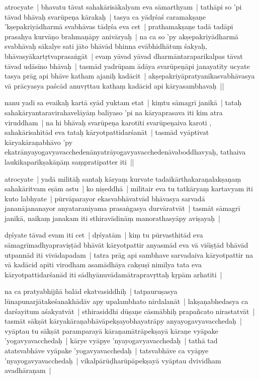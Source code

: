 \documentclass[article,a4paper]{memoir}
\begin{document}
	  \pstart atrocyate | bhavatu tā\-vat sahakā\-risā\-kalyam eva sā\-marthyam | tathā\-pi so 'pi tā\-vad bhā\-vaḥ svarū\-peṇa kā\-rakaḥ | \label{thakur75-74.28} tasya ca yā\-dṛśaś caramakṣaṇe 'kṣepakriyā\-dharmā\- svabhā\-vas tā\-dṛśa eva cet | \label{thakur75-74.29} prathamakṣaṇe tadā\- tadā\-pi prasahya kurvā\-ṇo brahmaṇā\-py anivā\-ryaḥ | na ca so 'py akṣepakriyā\-dharmā\- svabhā\-vaḥ sā\-kalye sati jā\-to bhā\-vā\-d bhinna evā\-bhidhā\-tuṃ śakyaḥ, bhā\-vasyā\-kartṛtvaprasaṅgā\-t | evaṃ yā\-vad yā\-vad dharmā\-ntaraparikalpas tā\-vat tā\-vad udā\-sī\-no bhā\-vaḥ | \label{thakur75-75.2} tasmā\-d yadrū\-pam ā\-dā\-ya svarū\-peṇā\-pi janayatī\-ty ucyate tasya prā\-g api bhā\-ve katham ajaniḥ kadā\-cit | akṣepakriyā\-pratyanī\-kasvabhā\-vasya vā\- prā\-cyasya paścā\-d anuvṛttau kathaṃ kadā\-cid api kā\-ryasambhavaḥ ||
	\pend
      

	  \pstart nanu yadi sa evaikaḥ kartā\- syā\-d yuktam etat | kiṃtu sā\-magrī\- janikā\- | tataḥ sahakā\-ryantaravirahavelā\-yā\-ṃ balī\-yaso 'pi na kā\-ryaprasava iti kim atra viruddham | na hi bhā\-vaḥ svarū\-peṇa karotī\-ti svarū\-peṇaiva karoti , sahakā\-risahitā\-d eva tataḥ kā\-ryotpattidarśanā\-t | tasmā\-d vyā\-ptivat kā\-ryakā\-raṇabhā\-vo 'py ekatrā\-nyayogavyavacchedenā\-nyatrā\-yogavyavacchedenā\-vaboddhavyaḥ, tathaiva laukikaparī\-kṣakā\-ṇā\-ṃ saṃpratipatter iti ||
	\pend
      

	  \pstart atrocyate | yadā\- militā\-ḥ santaḥ kā\-ryaṃ kurvate tadaikā\-rthakaraṇalakṣaṇaṃ sahakā\-ritvam eṣā\-m astu | ko niṣeddhā\- | militair eva tu tatkā\-ryaṃ kartavyam iti kuto labhyate | pū\-rvā\-parayor ekasvabhā\-vatvā\-d bhā\-vasya sarvadā\- jananā\-jananayor anyataraniyama prasaṅgasya durvā\-ratvā\-t | tasmā\-t sā\-magrī\- janikā\-, naikaṃ janakam iti sthiravā\-dinā\-ṃ manorathasyā\-py aviṣayaḥ |
	\pend
      

	  \pstart dṛśyate tā\-vad evam iti cet | dṛśyatā\-m | kiṃ tu pū\-rvasthitā\-d eva sā\-magrī\-madhyapraviṣṭā\-d bhā\-vā\-t kā\-ryotpattir anyasmā\-d eva vā\- viśiṣṭā\-d bhā\-vā\-d utpannā\-d iti vivā\-dapadam | tatra prā\-g api sambhave sarvadaiva kā\-ryotpattir na vā\- kadā\-cid apī\-ti virodham asamā\-dhā\-ya cakṣuṣī\- nimī\-lya tata eva kā\-ryotpattidarśanā\-d iti sā\-dhyā\-nuvā\-damā\-trapravṛttaḥ kṛpā\-m arhatī\-ti |
	\pend
      

	  \pstart na ca pratyabhijñā\- balā\-d ekatvasiddhiḥ | tatpauruṣasya lū\-napunarjā\-takeśanakhā\-dā\-v apy upalambhato nirdalanā\-t | lakṣaṇabhedasya ca darśayitum aśakyatvā\-t | sthirasiddhi dū\-ṣaṇe cā\-smā\-bhiḥ prapañcato nirastatvā\-t | \label{thakur75-75.22} tasmā\-t sā\-kṣā\-t kā\-ryakā\-raṇabhā\-vā\-pekṣayobhayatrā\-py anyayogavyavacchedaḥ | vyā\-ptau tu sā\-kṣā\-t paramparayā\- kā\-raṇamā\-trā\-pekṣayā\- kā\-raṇe vyā\-pake 'yogavyavacchedaḥ | kā\-rye vyā\-pye 'nyayogavyavacchedaḥ | tathā\- tad atatsvabhā\-ve vyā\-pake 'yogavyavacchedaḥ | tatsvabhā\-ve ca vyā\-pye 'nyayogavyavacchedaḥ | vikalpā\-rū\-ḍharū\-pā\-pekṣayā\- vyā\-ptau dvividham avadhā\-raṇam |
	\pend
      
\end{document}
